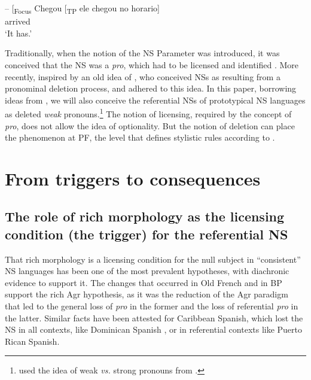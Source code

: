 \documentclass[output=paper,colorlinks,citecolor=brown]{langscibook}
\begin{document}
 \gll -- [\textsubscript{Focus} Chegou  [\textsubscript{TP} ele chegou  no horario]\\
     {} {} arrived\\
     \glt \hphantom{-- }‘It has.’
\z


Traditionally, when the notion of the NS Parameter was introduced, it was conceived that the NS was a \emph{pro}, which had to be licensed and identified \citep{rizzi_issues_1982}. More recently, inspired by an old idea of , who conceived NSs as resulting from a pronominal deletion process, \citet{holmberg_is_2005} and \citet{roberts_deletion_2010} adhered to this idea. In this paper, borrowing ideas from \citet{kato_restricoes_2014,kato_pre-verbal_2018}, we will also conceive the referential NSs of prototypical NS languages as deleted \emph{weak} pronouns.\footnote{\citet{kato_strong_1999} used the idea of weak \emph{vs.} strong pronouns from \citet{cardinaletti1999}.} The notion of licensing, required by the concept of \emph{pro}, does not allow the idea of optionality. But the notion of deletion can place the phenomenon at PF, the level that defines stylistic rules according to \citet{chomsky_filters_1977}.

\section{From triggers to consequences}\label{03:sec:kato:4}
\subsection{The role of rich morphology as the licensing condition (the trigger) for the referential NS}

That rich morphology is a licensing condition for the null subject in ``consistent'' NS languages \citep{roberts_introduction_2010} has been one of the most prevalent hypotheses, with diachronic evidence to support it. The changes that occurred in Old French \citep{adams1987, roberts_verbs_1993} and in BP \citep{duarte_pronome_1993,kato_strong_1999} support the rich Agr hypothesis, as it was the reduction of the Agr paradigm that led to the general loss of \emph{pro} in the former and the loss of referential \emph{pro} in the latter.  Similar facts have been attested for Caribbean Spanish, which lost the NS in all contexts, like Dominican Spanish \citep{toribio_dialectal_1994}, or in referential contexts like Puerto Rican Spanish.
\end{document}

